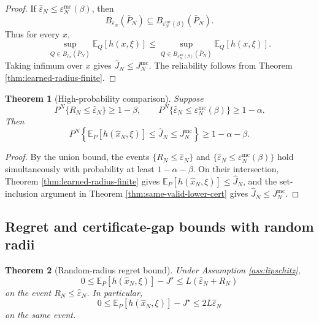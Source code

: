 \documentclass[11pt]{article}
\newtheorem{theorem}{Theorem}[section]
\newcommand{\E}{\mathbb{E}}
\newcommand{\1}{\mathbf{1}}
\newcommand{\Pbar}{\bar P_N}
\newcommand{\epshat}{\widehat\varepsilon_N}
\newcommand{\epsmc}{\varepsilon_N^{\mathrm{mc}}}
\begin{document}
\begin{proof}
If $\epshat\le\epsmc(\beta)$, then
\begin{equation}
    B_{\epshat}(\Pbar)\subseteq B_{\epsmc(\beta)}(\Pbar).
\end{equation}
Thus for every $x$,
\begin{equation}
    \sup_{Q\in B_{\epshat}(\Pbar)}\E_Q[h(x,\xi)]
    \le
    \sup_{Q\in B_{\epsmc(\beta)}(\Pbar)}\E_Q[h(x,\xi)].
\end{equation}
Taking infimum over $x$ gives $\widehat J_N\le J_N^{\mathrm{mc}}$. The reliability follows from Theorem \ref{thm:learned-radius-finite}.
\end{proof}

\begin{theorem}[High-probability comparison]\label{thm:hp-comparison-mc}
Suppose
\begin{equation}
    P^N\{R_N\le\epshat\}\ge1-\beta,
    \qquad
    P^N\{\epshat\le\epsmc(\beta)\}\ge1-\alpha.
\end{equation}
Then
\begin{equation}
    P^N\left\{\E_P[h(\widehat x_N,\xi)]\le\widehat J_N\le J_N^{\mathrm{mc}}\right\}
    \ge1-\alpha-\beta.
\end{equation}
\end{theorem}

\begin{proof}
By the union bound, the events $\{R_N\le\epshat\}$ and $\{\epshat\le\epsmc(\beta)\}$ hold simultaneously with probability at least $1-\alpha-\beta$. On their intersection, Theorem \ref{thm:learned-radius-finite} gives $\E_P[h(\widehat x_N,\xi)]\le\widehat J_N$, and the set-inclusion argument in Theorem \ref{thm:same-valid-lower-cert} gives $\widehat J_N\le J_N^{\mathrm{mc}}$.
\end{proof}

\subsection{Regret and certificate-gap bounds with random radii}

\begin{theorem}[Random-radius regret bound]\label{thm:random-radius-regret}
Under Assumption \ref{ass:lipschitz},
\begin{equation}\label{eq:random-radius-general-regret}
    0\le\E_P[h(\widehat x_N,\xi)]-J^\star
    \le L(\epshat+R_N)
\end{equation}
on the event $R_N\le\epshat$. In particular,
\begin{equation}
    0\le\E_P[h(\widehat x_N,\xi)]-J^\star\le2L\epshat
\end{equation}
on the same event.
\end{theorem}
\end{document}
